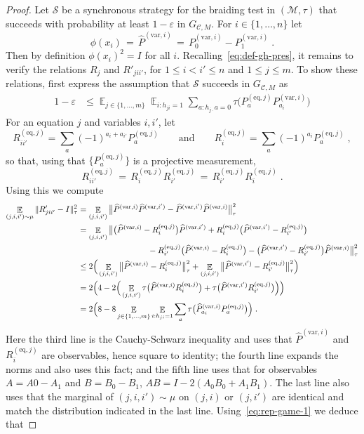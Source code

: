 \documentclass[11pt]{article}
\theoremstyle{definition}
\newcommand{\code}{\mathscr{C}}
\newcommand{\strategy}{\mathscr{S}}
\newcommand{\Id}{\ensuremath{I}}
\DeclareMathOperator*{\Expectation}{\mathbb{E}}
\newcommand{\Es}[1]{\Expectation_{#1}}
\newcommand{\mM}{\ensuremath{\mathcal{M}}}
\newcommand{\eps}{\varepsilon}
\newcommand{\eq}{\mathrm{eq}}
\newcommand{\var}{\mathrm{var}}
\begin{document}
\begin{proof}
Let $\strategy$ be a synchronous strategy for the braiding test  in  $(\mM,\tau)$ that succeeds with probability at least $1-\eps$ in $G_{\code,M}$. For $i\in\{1,\ldots,n\}$ let 
\[ \phi(x_i)\,=\,{\widehat{P}}^{(\var,i)}\,=\, P^{(\var,i)}_0-P^{(\var,i)}_1\;.\]
Then by definition $\phi(x_i)^2=\Id$ for all $i$. Recalling~\eqref{eq:def-gh-pres}, it remains to verify the relations $R_j$ and $R'_{jii'}$, for $1\leq i<i'\leq n$ and $1\leq j \leq m$. To show these relations, first express the assumption that $\strategy$ succeeds in $G_{\code,M}$ as
\begin{align}
1-\eps &\leq \Es{j\in\{1,\ldots,m\}} \Es{i: h_{ji}=1} \sum_{a:h_{j\cdot} a=0}\tau\big(P^{(\eq,j)}_a P^{(\var,i)}_{a_i}\big)\label{eq:rep-game-1}
\end{align}
For an equation $j$ and variables $i,i'$, let 
\[ R^{(\eq,j)}_{ii'} = \sum_a (-1)^{a_i+a_{i'}} P^{(\eq,j)}_a\qquad\text{and}\qquad R^{(\eq,j)}_{i} = \sum_a (-1)^{a_i}P^{(\eq,j)}_a\;,\]
so that, using that $\{P^{(\eq,j)}_a\}$ is a projective measurement, 
\[R^{(\eq,j)}_{ii'} \,=\, R^{(\eq,j)}_{i}R^{(\eq,j)}_{i'}\,=\,R^{(\eq,j)}_{i'}R^{(\eq,j)}_{i}\;.\]
Using this we compute  
\begin{align*}
\Es{(j,i,i')\sim\mu} \|R'_{jii'}-\Id\|_\tau^2 &= \Es{(j,i,i')} \big\| \widehat{P}^{(\var,i)}\widehat{P}^{(\var,i')} - \widehat{P}^{(\var,i')}\widehat{P}^{(\var,i)}\big\|_\tau^2\\
&= \Es{(j,i,i')} \big\| \big(\widehat{P}^{(\var,i)} - R^{(\eq,j)}_{i}\big)\widehat{P}^{(\var,i')} + R^{(\eq,j)}_{i}\big(\widehat{P}^{(\var,i')}-R^{(\eq,j)}_{i'}\big)  \\
&\hskip3cm - R^{(\eq,j)}_{i'}\big(\widehat{P}^{(\var,i)}-R^{(\eq,j)}_{i}\big)- \big(\widehat{P}^{(\var,i')}- R^{(\eq,j)}_{i'}\big)\widehat{P}^{(\var,i)}  \big\|_\tau^2\\
&\leq 2\Big( \Es{(j,i,i')} \big\| \widehat{P}^{(\var,i)} - R^{(\eq,j)}_{i}\big\|_\tau^2 +\Es{(j,i,i')} \big\| \widehat{P}^{(\var,i')} - R^{(\eq,j)}_{i'}\big\|_\tau^2\Big)\\
&= 2\Big(4-2\Big(\Es{(j,i,i')} \tau\big( \widehat{P}^{(\var,i)}  R^{(\eq,j)}_{i}\big) +\tau\big(\widehat{P}^{(\var,i')}  R^{(\eq,j)}_{i'}\big)\Big)\Big)\\
&=2\Big(8-8 \Es{j\in\{1,\ldots,m\}} \Es{i:h_{ji}=1}\sum_{a} \tau\big( \widehat{P}^{(\var,i)}_{a_i}  P^{(\eq,j)}_{a}\big)\Big)\;.
\end{align*}
Here the third line is the Cauchy-Schwarz inequality and uses that $\widehat{P}^{(\var,i)}$ and $R^{(\eq,j)}_{i}$ are observables, hence square to identity; the fourth line expands the norms and also uses this fact; and the fifth line uses that for observables $A=A0-A_1$ and $B=B_0-B_1$, $AB=\Id-2(A_0B_0+A_1B_1)$. The last line also uses that the marginal of $(j,i,i')\sim\mu$ on $(j,i)$ or $(j,i')$ are identical and match the distribution indicated in the last line. Using~\eqref{eq:rep-game-1} we deduce that  

\end{proof}
\end{document}
